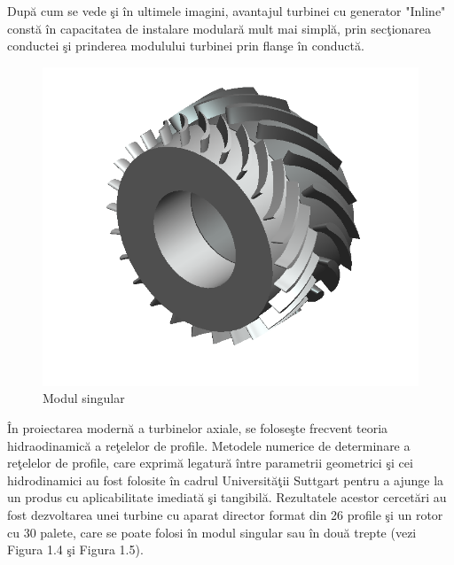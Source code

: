 Dup\u{a} cum se vede \c{s}i \^{i}n ultimele imagini, avantajul turbinei cu generator "Inline" const\u{a} \^{i}n capacitatea de instalare modular\u{a} mult mai simpl\u{a}, prin sec\c{t}ionarea conductei \c{s}i prinderea modulului turbinei prin flan\c{s}e \^{i}n conduct\u{a}.

\begin{figure}[h!]
	\centering
	\includegraphics[scale=0.6]{figures/modul_singular.png}
	\caption{Modul singular \cite{susanhub}}
	\label{Modul singular}
\end{figure}

\^{I}n proiectarea modern\u{a} a turbinelor axiale, se folose\c{s}te frecvent teoria hidraodinamic\u{a} a re\c{t}elelor de profile. Metodele numerice de determinare a re\c{t}elelor de profile, care exprim\u{a} legatur\u{a} \^{i}ntre parametrii geometrici \c{s}i cei hidrodinamici au fost folosite \^{i}n cadrul Universit\u{a}\c{t}ii Suttgart pentru a ajunge la un produs cu aplicabilitate imediat\u{a} \c{s}i tangibil\u{a}. Rezultatele acestor cercet\u{a}ri au fost dezvoltarea unei turbine cu aparat director format din 26 profile \c{s}i un rotor cu 30 palete, care se poate folosi \^{i}n modul singular sau \^{i}n dou\u{a} trepte (vezi Figura 1.4 \c{s}i Figura 1.5).

